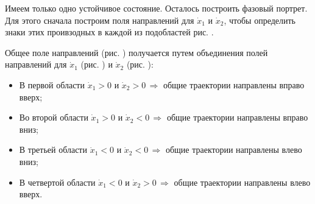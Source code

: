 \documentclass[12pt,a4paper]{article}
\begin{document}
    Имеем только одно устойчивое состояние. Осталось построить фазовый портрет. Для этого сначала построим поля направлений для $ \dot x_1 $ и $ \dot x_2 $, чтобы определить знаки этих проивзодных в каждой из подобластей рис. .






    Общее поле направлений (рис. ) получается путем объединения полей направлений для $ \dot x_1 $ (рис. ) и $ \dot x_2 $ (рис. ):

    \begin{itemize}
        \setlength\itemsep{0.4em}
        \item В первой области $ \dot x_1 > 0 $ и $ \dot x_2 > 0 \, \Rightarrow $ общие траектории направлены вправо вверх;
        \item Во второй области $ \dot x_1 > 0 $ и $ \dot x_2 < 0 \, \Rightarrow $ общие траектории направлены вправо вниз;
        \item В третьей области $ \dot x_1 < 0 $ и $ \dot x_2 < 0 \, \Rightarrow $ общие траектории направлены влево вниз;
        \item В четвертой области $ \dot x_1 < 0 $ и $ \dot x_2 > 0 \, \Rightarrow $ общие траектории направлены влево вверх.
    \end{itemize}
\end{document}
